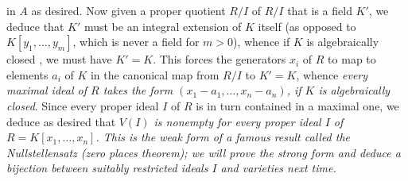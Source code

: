\documentclass[10pt]{article}
\begin{document}
in $A$ as desired. Now given a proper quotient $R/I$ of $R/I$ that is a
field $K'$, we deduce that $K'$ must be an integral extension of $K$
itself (as opposed to $K[y_1,\ldots,y_m]$, which is never a field for
$m>0$), whence if $K$ is algebraically closed , we must have $K'=K$.
This forces the generators $x_i$ of $R$ to map to elements $a_i$ of $K$
in the canonical map from $R/I$ to $K'=K$, whence {\sl every maximal
  ideal of $R$ takes the form $(x_1-a_1,\ldots,x_n-a_n)$, if $K$ is
  algebraically closed}. Since every proper ideal $I$ of $R$ is in turn
contained in a maximal one, we deduce as desired that \sl{$V(I)$ is
  nonempty for every proper ideal $I$ of $R=K[x_1,\ldots,x_n]$}. This is
the weak form of a famous result called the Nullstellensatz (zero places
theorem); we will prove the strong form and deduce a bijection between
suitably restricted ideals $I$ and varieties next time.
\end{document}

